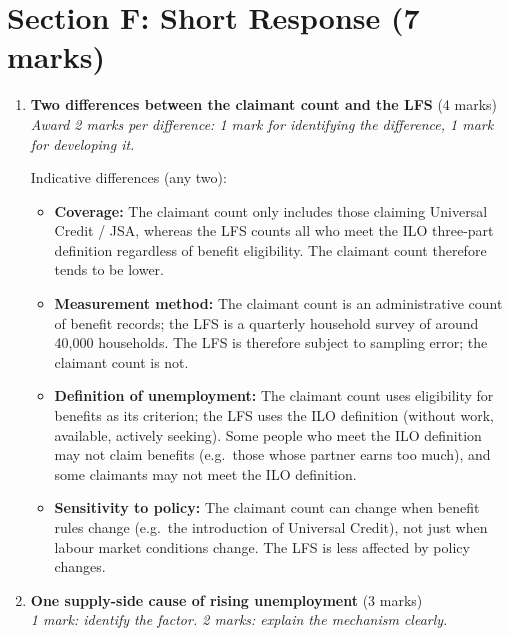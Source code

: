 \documentclass[12pt,a4paper]{article}
\begin{document}
\section*{Section F: Short Response (7 marks)}

\begin{enumerate}[leftmargin=*, label=\textbf{\arabic*.}]

    \item \textbf{Two differences between the claimant count and the LFS} \hfill (4 marks)\\
    \textit{Award 2 marks per difference: 1 mark for identifying the difference, 1 mark for developing it.}

    \vspace{0.3em}
    Indicative differences (any two):
    \begin{itemize}
        \item \textbf{Coverage:} The claimant count only includes those claiming Universal Credit / JSA, whereas the LFS counts all who meet the ILO three-part definition regardless of benefit eligibility. The claimant count therefore tends to be lower.
        \item \textbf{Measurement method:} The claimant count is an administrative count of benefit records; the LFS is a quarterly household survey of around 40,000 households. The LFS is therefore subject to sampling error; the claimant count is not.
        \item \textbf{Definition of unemployment:} The claimant count uses eligibility for benefits as its criterion; the LFS uses the ILO definition (without work, available, actively seeking). Some people who meet the ILO definition may not claim benefits (e.g.\ those whose partner earns too much), and some claimants may not meet the ILO definition.
        \item \textbf{Sensitivity to policy:} The claimant count can change when benefit rules change (e.g.\ the introduction of Universal Credit), not just when labour market conditions change. The LFS is less affected by policy changes.
    \end{itemize}

    \vspace{0.5em}

    \item \textbf{One supply-side cause of rising unemployment} \hfill (3 marks)\\
    \textit{1 mark: identify the factor. 2 marks: explain the mechanism clearly.}


\end{enumerate}
\end{document}
